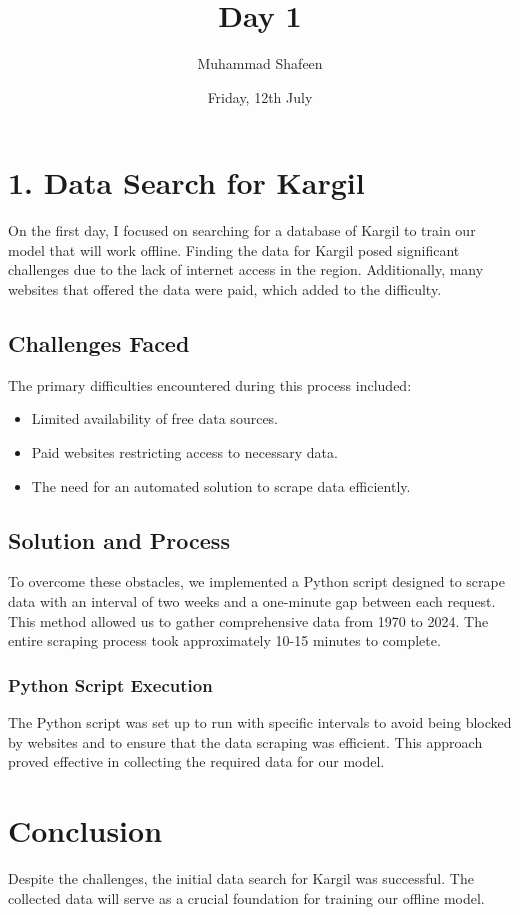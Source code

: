 \documentclass[12pt]{article}
\title{Day 1}
\author{Muhammad Shafeen}
\date{Friday, 12th July}
\begin{document}
\maketitle

\section*{1. Data Search for Kargil}
On the first day, I focused on searching for a database of Kargil to train our model that will work offline. Finding the data for Kargil posed significant challenges due to the lack of internet access in the region. Additionally, many websites that offered the data were paid, which added to the difficulty.

\subsection*{Challenges Faced}
The primary difficulties encountered during this process included:
\begin{itemize}
    \item Limited availability of free data sources.
    \item Paid websites restricting access to necessary data.
    \item The need for an automated solution to scrape data efficiently.
\end{itemize}

\subsection*{Solution and Process}
To overcome these obstacles, we implemented a Python script designed to scrape data with an interval of two weeks and a one-minute gap between each request. This method allowed us to gather comprehensive data from 1970 to 2024. The entire scraping process took approximately 10-15 minutes to complete.

\subsubsection*{Python Script Execution}
The Python script was set up to run with specific intervals to avoid being blocked by websites and to ensure that the data scraping was efficient. This approach proved effective in collecting the required data for our model.

\section*{Conclusion}
Despite the challenges, the initial data search for Kargil was successful. The collected data will serve as a crucial foundation for training our offline model.
\end{document}
